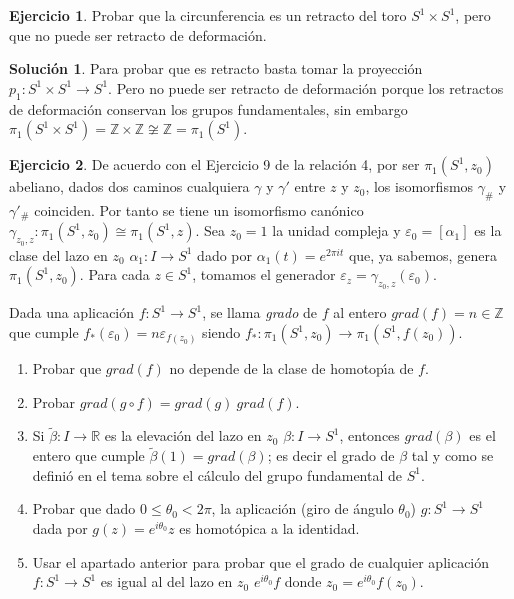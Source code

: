 \documentclass{article}
\theoremstyle{plain}
\theoremstyle{definition}
\newtheorem{exercise}{Ejercicio}
\newtheorem*{sol*}{Solución}
\newcommand{\Z}{\mathbb{Z}}
\begin{document}
\newpage

\begin{exercise} Probar que la circunferencia es un retracto del toro $S^1\times S^1$, pero que no puede ser retracto de deformaci\'on.
\end{exercise}
\begin{sol*}
Para probar que es retracto basta tomar la proyección $p_1:S^1\times S^1\to S^1$. Pero no puede ser retracto de deformación porque los retractos de deformación conservan los grupos fundamentales, sin embargo $\pi_1(S^1\times S^1)=\Z\times\Z\not\cong\Z =\pi_1(S^1)$.
\end{sol*}

\newpage

\begin{exercise} \label{grado1} De acuerdo con el Ejercicio 9 de la relaci\'on 4, por ser $\pi_1(S^1,z_0)$ abeliano, dados dos caminos cualquiera $\gamma$ y  $\gamma'$ entre $z$ y $z_0$, los isomorfismos $\gamma_{\#}$ y $\gamma'_{\#}$ coinciden. Por tanto se tiene un isomorfismo can\'onico $\gamma_{z_0,z}: \pi_1(S^1,z_0) \cong \pi_1(S^1,z)$. Sea $z_0 = 1$ la unidad compleja y $\varepsilon_0 = [\alpha_1]$ es la clase del lazo en $z_0$ $\alpha_1: I \to S^1$ dado por $\alpha_1(t) = e^{2\pi it}$ que, ya sabemos, genera $\pi_1(S^1,z_0)$. Para cada $z\in S^1$, tomamos el generador $\varepsilon_z = \gamma_{z_0,z}(\varepsilon_0)$.
\par
Dada una aplicaci\'on $f: S^1\to S^1$, se llama \emph{grado} de $f$ al entero $grad(f) = n\in \mathbb{Z}$ que cumple $f_*(\varepsilon_0) = n \varepsilon_{f(z_0)}$ siendo $f_*: \pi_1(S^1,z_0) \to \pi_1(S^1,f(z_0))$.
\begin{enumerate}
\item Probar que $grad(f)$ no depende de la clase de homotop\'{\i}a de $f$.
\item Probar $grad(g\circ f) = grad(g) \ grad(f)$.
\item Si $\widetilde{\beta}: I \to \mathbb{R}$ es la elevaci\'on del lazo en $z_0$ $\beta: I \to S^1$, entonces  $grad(\beta)$ es el
entero que cumple $\widetilde{\beta}(1) = grad(\beta)$; es decir el grado de $\beta$ tal y como se defini\'o en el tema sobre el c\'alculo del grupo fundamental de $S^1$.
\item Probar que dado $0\leq \theta_0 < 2\pi$, la aplicaci\'on (giro de \'angulo $\theta_0$) $g: S^1\to S^1$ dada por $g(z) =  e^{i\theta_0}z$ es homot\'opica a la identidad.
    \item Usar el apartado anterior para probar que el grado de cualquier aplicaci\'on $f: S^1\to S^1$ es igual al del lazo en $z_0$ $e^{i\theta_0}f$ donde $z_0 = e^{i\theta_0} f(z_0)$.

\end{enumerate}
\end{exercise}
\end{document}
